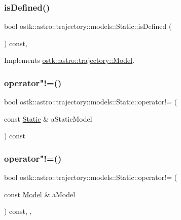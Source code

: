 \subsubsection{\texorpdfstring{is\+Defined()}{isDefined()}}
{\footnotesize\ttfamily bool ostk\+::astro\+::trajectory\+::models\+::\+Static\+::is\+Defined (\begin{DoxyParamCaption}{ }\end{DoxyParamCaption}) const\hspace{0.3cm}{\ttfamily [override]}, {\ttfamily [virtual]}}



Implements \hyperlink{classostk_1_1astro_1_1trajectory_1_1_model_a0d5cf6f754905f06c0ec1e39618c20a1}{ostk\+::astro\+::trajectory\+::\+Model}.

\mbox{\label{classostk_1_1astro_1_1trajectory_1_1models_1_1_static_af1f7415dfe8c549156734749ef4caaf4}} 
\subsubsection{\texorpdfstring{operator"!=()}{operator!=()}\hspace{0.1cm}{\footnotesize\ttfamily [1/2]}}
{\footnotesize\ttfamily bool ostk\+::astro\+::trajectory\+::models\+::\+Static\+::operator!= (\begin{DoxyParamCaption}\item[{const \hyperlink{classostk_1_1astro_1_1trajectory_1_1models_1_1_static}{Static} \&}]{a\+Static\+Model }\end{DoxyParamCaption}) const}

\mbox{\label{classostk_1_1astro_1_1trajectory_1_1models_1_1_static_af85efc113db69c75c1afc7db0e81297b}} 
\subsubsection{\texorpdfstring{operator"!=()}{operator!=()}\hspace{0.1cm}{\footnotesize\ttfamily [2/2]}}
{\footnotesize\ttfamily bool ostk\+::astro\+::trajectory\+::models\+::\+Static\+::operator!= (\begin{DoxyParamCaption}\item[{const \hyperlink{classostk_1_1astro_1_1trajectory_1_1_model}{Model} \&}]{a\+Model }\end{DoxyParamCaption}) const\hspace{0.3cm}{\ttfamily [override]}, {\ttfamily [protected]}, {\ttfamily [virtual]}}



